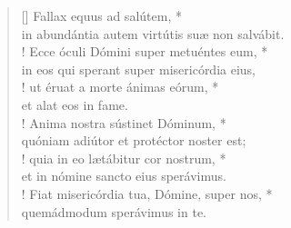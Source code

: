 \begin{verse}[\versewidth]
Fallax equus ad salútem, *\\
in abundántia autem virtútis suæ non salvábit.\\!
\vin Ecce óculi Dómini super metuéntes eum, *\\
\vin in eos qui sperant super misericórdia eius,\\!
ut éruat a morte ánimas eórum, *\\
et alat eos in fame.\\!
\vin Anima nostra sústinet Dóminum, *\\
\vin quóniam adiútor et protéctor noster est;\\!
quia in eo lætábitur cor nostrum, *\\
et in nómine sancto eius sperávimus.\\!
\vin Fiat misericórdia tua, Dómine, super nos, *\\
\vin quemádmodum sperávimus in te.\\
\end{verse}
\vspace{1cm}


